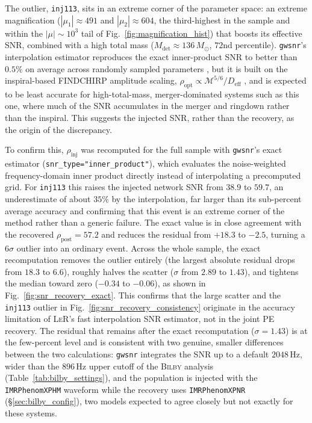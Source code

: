 The outlier, \texttt{inj113}, sits in an extreme corner of the parameter space: an extreme magnification ($|\mu_1|\approx491$ and $|\mu_2|\approx604$, the third-highest in the sample and within the $|\mu|\sim10^3$ tail of Fig.~\ref{fig:magnification_hist}) that boosts its effective SNR, combined with a high total mass ($M_\mathrm{det}\approx136\,M_\odot$, $72$nd percentile). \texttt{gwsnr}'s interpolation estimator reproduces the exact inner-product SNR to better than $0.5\%$ on average across randomly sampled parameters \cite{gwsnrpythonpackageefficient}, but it is built on the inspiral-based FINDCHIRP amplitude scaling, $\rho_\mathrm{opt}\propto\mathcal{M}^{5/6}/D_\mathrm{eff}$ \cite{gwsnrpythonpackageefficient}, and is expected to be least accurate for high-total-mass, merger-dominated systems such as this one, where much of the SNR accumulates in the merger and ringdown rather than the inspiral. This suggests the injected SNR, rather than the recovery, as the origin of the discrepancy.

To confirm this, $\rho_\mathrm{inj}$ was recomputed for the full sample with \texttt{gwsnr}'s exact estimator (\texttt{snr\_type=\allowbreak "inner\_\allowbreak product"}), which evaluates the noise-weighted frequency-domain inner product directly instead of interpolating a precomputed grid. For \texttt{inj113} this raises the injected network SNR from $38.9$ to $59.7$, an underestimate of about $35\%$ by the interpolation, far larger than its sub-percent average accuracy and confirming that this event is an extreme corner of the method rather than a generic failure. The exact value is in close agreement with the recovered $\rho_\mathrm{post}=57.2$ and reduces the residual from $+18.3$ to $-2.5$, turning a $6\sigma$ outlier into an ordinary event. Across the whole sample, the exact recomputation removes the outlier entirely (the largest absolute residual drops from $18.3$ to $6.6$), roughly halves the scatter ($\sigma$ from $2.89$ to $1.43$), and tightens the median toward zero ($-0.34$ to $-0.06$), as shown in Fig.~\ref{fig:snr_recovery_exact}. This confirms that the large scatter and the \texttt{inj113} outlier in Fig.~\ref{fig:snr_recovery_consistency} originate in the accuracy limitation of \textsc{LeR}'s fast interpolation SNR estimator, not in the joint PE recovery. The residual that remains after the exact recomputation ($\sigma=1.43$) is at the few-percent level and is consistent with two genuine, smaller differences between the two calculations: \texttt{gwsnr} integrates the SNR up to a default $2048\,\mathrm{Hz}$, wider than the $896\,\mathrm{Hz}$ upper cutoff of the \textsc{Bilby} analysis (Table~\ref{tab:bilby_settings}), and the population is injected with the \texttt{IMRPhenomXPHM} waveform while the recovery uses \texttt{IMRPhenomXPNR} (\S\ref{sec:bilby_config}), two models expected to agree closely but not exactly for these systems.

